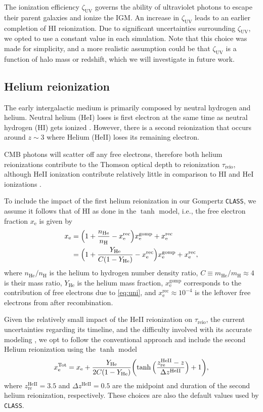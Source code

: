\documentclass[12pt, a4paper]{article}
\newcommand{\zetaUV}{\zeta_\mathrm{UV}}
\newcommand{\He}{\mathrm{He}}
\newcommand{\HeII}{\mathrm{HeII}}
\newcommand{\e}{\mathrm{e}}
\newcommand{\re}{\mathrm{re}}
\newcommand{\reio}{\mathrm{reio}}
\newcommand{\rec}{\mathrm{rec}}
\newcommand{\gomp}{\mathrm{gomp}}
\begin{document}
The ionization efficiency $\zetaUV$ governs the ability of ultraviolet
photons to escape their parent galaxies and ionize the IGM. An increase
in $\zetaUV$ leads to an earlier completion of HI reionization.
Due to significant uncertainties surrounding $\zetaUV$, we opted to use
a constant value in each simulation.
Note that this choice was made for simplicity, and a more realistic
assumption could be that $\zetaUV$ is a function of halo mass
\cite{Park2019} or redshift, which we will investigate in future
work.


\subsection*{Helium reionization}
\label{sec:helium}

The early intergalactic medium is primarily composed by neutral hydrogen
and helium.
Neutral helium (HeI) loses is first electron at the same time as neutral
hydrogen (HI) gets ionized \cite{Trac2007}.
However, there is a second reionization that occurs around $z\sim3$
where Helium (HeII) loses its remaining electron.

CMB photons will scatter off any free electrons, therefore both helium
reionizations contribute to the Thomson optical depth to reionization
$\tau_\reio$, although HeII ionization contribute relatively little in
comparison to HI and HeI ionizations \cite{Liu2016}.

To include the impact of the first helium reionization in our Gompertz
\texttt{CLASS}, we assume it follows that of HI as done in the $\tanh$
model, i.e., the free electron fraction $x_\e$ is given by
%
\begin{align}
\label{eq:xe_H_He}
x_\e
&= \Bigl(1 + \frac{n_\He}{n_\mathrm{H}} - x^\rec_\e\Bigr) x_\e^\gomp
  + x^\rec_\e
\nonumber\\
%
&= \Bigl(1 + \frac{Y_\He}{C (1 - Y_\He)} - x^\rec_\e\Bigr) x_\e^\gomp
  + x^\rec_\e,
\end{align}
%
where $n_\He / n_\mathrm{H}$ is the helium to hydrogen number density
ratio, $C \equiv m_\He / m_\mathrm{H} \approx 4$ is their mass ratio,
$Y_\He$ is the helium mass fraction, $x_\e^\gomp$ corresponds to the
contribution of free electrons due to \cref{eq:uni}, and $x^\rec_\e
\approx 10^{-4}$ is the leftover free electrons from after
recombination.

Given the relatively small impact of the HeII reionization on
$\tau_\reio$, the current uncertainties regarding its timeline, and the
difficulty involved with its accurate modeling \cite{Hotinli2023,
Upton2020}, we opt to follow the conventional approach and include the
second Helium reionization using the $\tanh$ model
%
\begin{equation}
\label{eq:xe_tot}
x_\e^\mathrm{Tot} = x_\e + \frac{Y_\He}{2C(1 - Y_\He)}
  \biggl(\tanh{\Bigl(\frac{z_\re^\HeII - z}{\Delta z^\HeII}\Bigr)} + 1\biggr),
\end{equation}
%
where $z_\re^\HeII = 3.5$ and $\Delta z^\HeII = 0.5$ are the midpoint
and duration of the second helium reionization, respectively.
These choices are also the default values used by \texttt{CLASS}.
\end{document}
